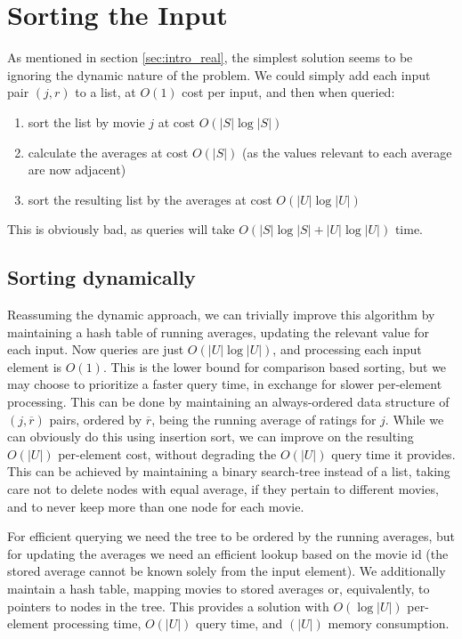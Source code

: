 \section{Sorting the Input}
\label{sec:sorting}
As mentioned in section \ref{sec:intro_real}, the simplest solution seems to be
ignoring the dynamic nature of the problem. We could simply add each input pair
$(j,r)$ to a list, at $O(1)$ cost per input, and then when queried:
\begin{enumerate}
	\item sort the list by movie $j$ at cost $O(|S| \log |S|)$
	\item calculate the averages at cost $O(|S|)$ (as the values relevant to
		each average are now adjacent)
	\item sort the resulting list by the averages at cost $O(|U| \log |U|)$
\end{enumerate}

This is obviously bad, as queries will take $O(|S| \log |S| + |U| \log|U|)$
time.
\subsection{Sorting dynamically}
Reassuming the dynamic approach, we can trivially improve this algorithm
by maintaining a hash table of running averages, updating the relevant value for
each input. Now queries are just $O(|U| \log |U|)$, and processing each input
element is $O(1)$. This is the lower bound for comparison based sorting, but we
may choose to prioritize a faster query time, in exchange for slower per-element
processing. This can be done by maintaining an always-ordered data structure of
$(j, \overline r)$ pairs, ordered by $\overline r$, being the running average of
ratings for $j$. While we can obviously do this using insertion sort, we can
improve on the resulting $O(|U|)$ per-element cost, without degrading the $O(|U|)$
query time it provides. This can be achieved by maintaining a binary search-tree
instead of a list, taking care not to delete nodes with equal average, if they
pertain to different movies, and to never keep more than one node for each
movie.

For efficient querying we need the tree to be ordered by the
running averages, but for updating the averages we need an efficient lookup
based on the movie id (the stored average cannot be known solely from the input
element). We additionally maintain a hash table, mapping movies to stored
averages or, equivalently, to pointers to nodes in the tree. This provides a
solution with $O(\log |U|)$ per-element processing time, $O(|U|)$ query
time, and $(|U|)$ memory consumption.

